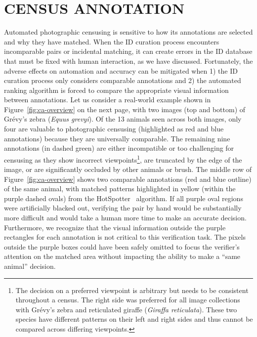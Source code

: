 \chapter{CENSUS ANNOTATION} \label{chapter:ca}

\noindent Automated photographic censusing is sensitive to how its annotations are selected and why they have matched.  When the ID curation process encounters incomparable pairs or incidental matching, it can create errors in the ID database that must be fixed with human interaction, as we have discussed.  Fortunately, the adverse effects on automation and accuracy can be mitigated when 1) the ID curation process only considers comparable annotations and 2) the automated ranking algorithm is forced to compare the appropriate visual information between annotations.  Let us consider a real-world example shown in Figure~\ref{fig:ca-overview} on the next page, with two images (top and bottom) of Gr\'evy's zebra (\textit{Equus grevyi}).  Of the 13 animals seen across both images, only four are valuable to photographic censusing (highlighted as red and blue annotations) because they are universally comparable.  The remaining nine annotations (in dashed green) are either incompatible or too challenging for censusing as they show incorrect viewpoints\footnote{The decision on a preferred viewpoint is arbitrary but needs to be consistent throughout a census.  The right side was preferred for all image collections with Gr\'evy's zebra and reticulated giraffe (\textit{Giraffa reticulata}).  These two species have different patterns on their left and right sides and thus cannot be compared across differing viewpoints.}, are truncated by the edge of the image, or are significantly occluded by other animals or brush.  The middle row of Figure~\ref{fig:ca-overview} shows two comparable annotations (red and blue outline) of the same animal, with matched patterns highlighted in yellow (within the purple dashed ovals) from the HotSpotter~\cite{crall_identifying_2017} algorithm.  If all purple oval regions were artificially blacked out, verifying the pair by hand would be substantially more difficult and would take a human more time to make an accurate decision.  Furthermore, we recognize that the visual information outside the purple rectangles for each annotation is not critical to this verification task.  The pixels outside the purple boxes could have been safely omitted to focus the verifier's attention on the matched area without impacting the ability to make a ``same animal'' decision.

